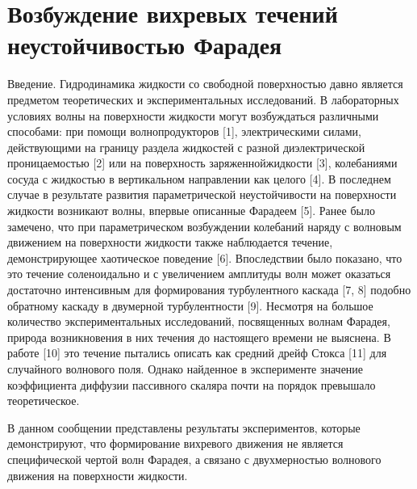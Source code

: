 \section{Возбуждение вихревых течений неустойчивостью Фарадея}%
Введение. Гидродинамика жидкости со свободной поверхностью давно является предметом теоретических и экспериментальных исследований. В лабораторных условиях волны на поверхности жидкости могут возбуждаться различными способами: при помощи волнопродукторов [1], электрическими силами, действующими на границу раздела жидкостей с разной диэлектрической проницаемостью [2] или на поверхность заряженнойжидкости [3], колебаниями сосуда с жидкостью в вертикальном направлении как целого [4]. В последнем случае в результате развития параметрической неустойчивости на поверхности жидкости возникают волны, впервые описанные Фарадеем [5]. Ранее было замечено, что при параметрическом возбуждении колебаний наряду с волновым движением на поверхности жидкости также наблюдается течение, демонстрирующее хаотическое поведение [6]. Впоследствии было показано, что это течение соленоидально и с увеличением амплитуды волн может оказаться достаточно интенсивным для формирования турбулентного каскада [7, 8] подобно обратному каскаду в двумерной турбулентности [9]. Несмотря на большое количество экспериментальных исследований, посвященных волнам Фарадея, природа возникновения в них течения до настоящего времени не выяснена. В работе [10] это течение пытались описать как средний дрейф Стокса [11] для случайного волнового поля. Однако найденное в эксперименте значение коэффициента диффузии пассивного скаляра почти на порядок превышало теоретическое.

В данном сообщении представлены результаты экспериментов, которые демонстрируют, что формирование вихревого движения не является специфической чертой волн Фарадея, а связано с двухмерностью волнового движения на поверхности жидкости.




\clearpage